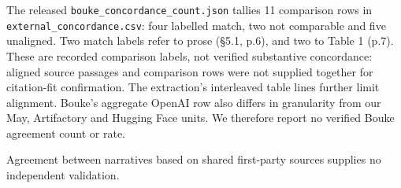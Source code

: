 \documentclass[conference]{IEEEtran}
\providecommand{\citep}[1]{\cite{#1}}
\begin{document}
The released \texttt{bouke\_concordance\_count.json} tallies 11 comparison rows in \texttt{external\_concordance.csv}: four labelled match, two not comparable and five unaligned. Two match labels refer to prose (§5.1, p.6), and two to Table 1 (p.7). These are recorded comparison labels, not verified substantive concordance: aligned source passages and comparison rows were not supplied together for citation-fit confirmation. The extraction's interleaved table lines further limit alignment. Bouke's aggregate OpenAI row also differs in granularity from our May, Artifactory and Hugging Face units. We therefore report no verified Bouke agreement count or rate. \citep{bouke2026competing}

Agreement between narratives based on shared first-party sources supplies no independent validation.
\label{lastpage}
\end{document}
